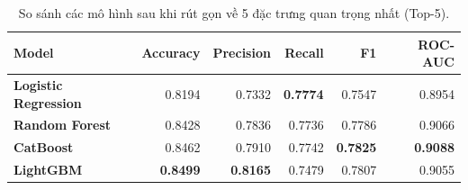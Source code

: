 \begin{table}[H]
  \centering
  \caption{So sánh các mô hình sau khi rút gọn về 5 đặc trưng quan trọng nhất (Top-5).}
  \label{tab:compare_top5}
  \small
  \setlength{\tabcolsep}{5pt}
  \begin{tabular}{lrrrrr}
    \toprule
    \textbf{Model} & \textbf{Accuracy} & \textbf{Precision} & \textbf{Recall} & \textbf{F1} & \textbf{ROC-AUC} \\
    \midrule
    \textbf{Logistic Regression} & 0.8194 & 0.7332 & \textbf{0.7774} & 0.7547 & 0.8954 \\
    \textbf{Random Forest} & 0.8428 & 0.7836 & 0.7736 & 0.7786 & 0.9066 \\
    \textbf{CatBoost} & 0.8462 & 0.7910 & 0.7742 & \textbf{0.7825} & \textbf{0.9088} \\
    \textbf{LightGBM} & \textbf{0.8499} & \textbf{0.8165} & 0.7479 & 0.7807 & 0.9055 \\
    \bottomrule
  \end{tabular}
\end{table}
